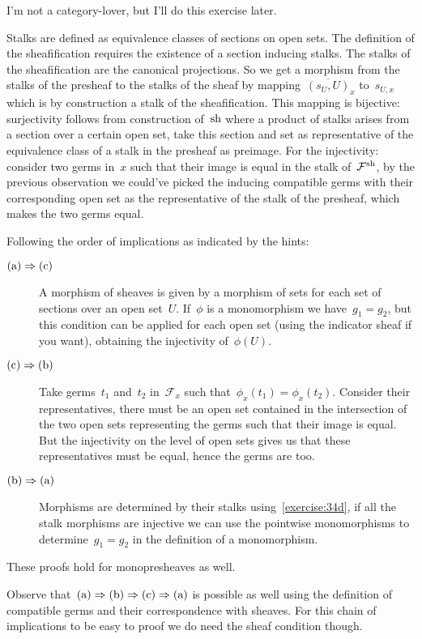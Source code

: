 \begin{exercise} %
  I'm not a category-lover, but I'll do this exercise later.
\end{exercise}

\begin{exercise} %
  Stalks are defined as equivalence classes of sections on open sets. The definition of the sheafification requires the existence of a section inducing stalks. The stalks of the sheafification are the canonical projections. So we get a morphism from the stalks of the presheaf to the stalks of the sheaf by mapping~$\overline{(s_U,U)}_x$ to~$s_{U,x}$ which is by construction a stalk of the sheafification. This mapping is bijective: surjectivity follows from construction of~$\operatorname{sh}$ where a product of stalks arises from a section over a certain open set, take this section and set as representative of the equivalence class of a stalk in the presheaf as preimage. For the injectivity: consider two germs in~$x$ such that their image is equal in the stalk of~$\mathcal{F}^{\operatorname{sh}}$, by the previous observation we could've picked the inducing compatible germs with their corresponding open set as the representative of the stalk of the presheaf, which makes the two germs equal.
\end{exercise}

\begin{exercise}
  Following the order of implications as indicated by the hints:
  \begin{description}
    \item[$\textnormal{(a)}\Rightarrow\textnormal{(c)}$] A morphism of sheaves is given by a morphism of sets for each set of sections over an open set~$U$. If~$\phi$ is a monomorphism we have~$g_1=g_2$, but this condition can be applied for each open set (using the indicator sheaf if you want), obtaining the injectivity of~$\phi(U)$.

    \item[$\textnormal{(c)}\Rightarrow\textnormal{(b)}$] Take germs~$t_1$ and~$t_2$ in~$\mathcal{F}_x$ such that~$\phi_x(t_1)=\phi_x(t_2)$. Consider their representatives, there must be an open set contained in the intersection of the two open sets representing the germs such that their image is equal. But the injectivity on the level of open sets gives us that these representatives must be equal, hence the germs are too.

    \item[$\textnormal{(b)}\Rightarrow\textnormal{(a)}$] Morphisms are determined by their stalks using~\autoref{exercise:34d}, if all the stalk morphisms are injective we can use the pointwise monomorphisms to determine~$g_1=g_2$ in the definition of a monomorphism.
  \end{description}

  These proofs hold for monopresheaves as well.

  Observe that~$\textnormal{(a)}\Rightarrow\textnormal{(b)}\Rightarrow\textnormal{(c)}\Rightarrow\textnormal{(a)}$ is possible as well using the definition of compatible germs and their correspondence with sheaves. For this chain of implications to be easy to proof we do need the sheaf condition though.
\end{exercise}
